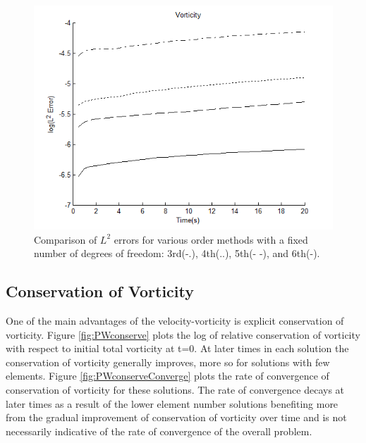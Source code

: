 \documentclass[letterpaper,12pt]{report}
\begin{document}
\begin{figure}
\centering
\includegraphics[width=1\textwidth]{Pl2.PNG}
\caption{\label{fig:PL2}Comparison of $L^2$ errors for various order methods with a fixed number of degrees of freedom: 3rd(-.), 4th(..), 5th(- -), and 6th(-).}
\end{figure}

%
\subsection{Conservation of Vorticity}\label{PConserveW}
One of the main advantages of the velocity-vorticity is explicit conservation of vorticity. Figure \ref{fig:PWconserve} plots the log of relative conservation of vorticity with respect to initial total vorticity at t=0. At later times in each solution the conservation of vorticity generally improves, more so for solutions with few elements. Figure \ref{fig:PWconserveConverge} plots the rate of convergence of conservation of vorticity for these solutions. The rate of convergence decays at later times as a result of the lower element number solutions benefiting more from the gradual improvement of conservation of vorticity over time and is not necessarily indicative of the rate of convergence of the overall problem.
\end{document}
